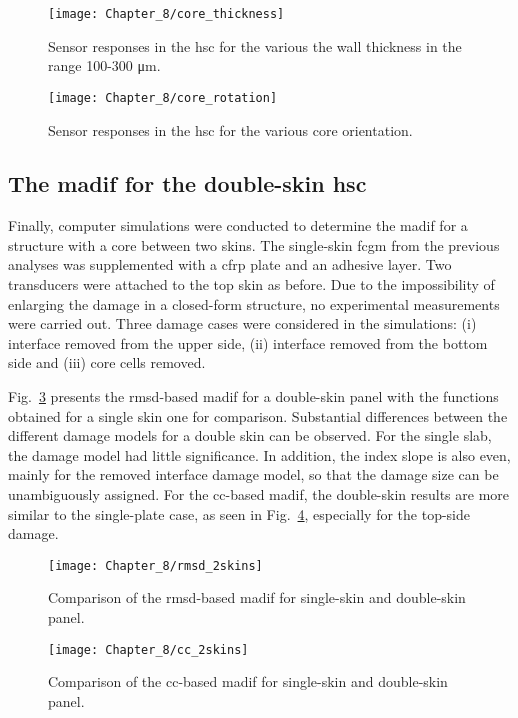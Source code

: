 \begin{figure}
	\begin{center}
		\texttt{[image: Chapter\_8/core\_thickness]}
	\end{center}
	\caption{Sensor responses in the \acf{hsc} for the various the wall thickness in the range 100-300 \unit{\micro\m}.}
	\label{fig:core_thickness}
\end{figure}

\begin{figure}
	\begin{center}
		\texttt{[image: Chapter\_8/core\_rotation]}
	\end{center}
	\caption{Sensor responses in the \acf{hsc} for the various core orientation.}
	\label{fig:core_rotation}
\end{figure}

\subsection{The \ac{madif} for the double-skin \ac{hsc}}

Finally, computer simulations were conducted to determine the \ac{madif} for a structure with a core between two skins.
The single-skin \ac{fcgm} from the previous analyses was supplemented with a \ac{cfrp} plate and an adhesive layer.
Two transducers were attached to the top skin as before.
Due to the impossibility of enlarging the damage in a closed-form structure, no experimental measurements were carried out.
Three damage cases were considered in the simulations: (i) interface removed from the upper side, (ii) interface removed from the bottom side and (iii) core cells removed.

Fig.~\ref{fig:rmsd_2skins} presents the \ac{rmsd}-based \ac{madif} for a double-skin panel with the functions obtained for a single skin one for comparison.
Substantial differences between the different damage models for a double skin can be observed.
For the single slab, the damage model had little significance.
In addition, the index slope is also even, mainly for the removed interface damage model, so that the damage size can be unambiguously assigned.
For the \ac{cc}-based \ac{madif}, the double-skin results are more similar to the single-plate case, as seen in Fig.~\ref{fig:cc_2skins}, especially for the top-side damage.
\begin{figure}
	\begin{center}
		\texttt{[image: Chapter\_8/rmsd\_2skins]}
	\end{center}
	\caption{Comparison of the \acf{rmsd}-based \acf{madif} for single-skin and double-skin panel.}
	\label{fig:rmsd_2skins}
\end{figure}
\begin{figure}
	\begin{center}
		\texttt{[image: Chapter\_8/cc\_2skins]}
	\end{center}
	\caption{Comparison of the \acf{cc}-based \acf{madif} for single-skin and double-skin panel.}
	\label{fig:cc_2skins}
\end{figure}